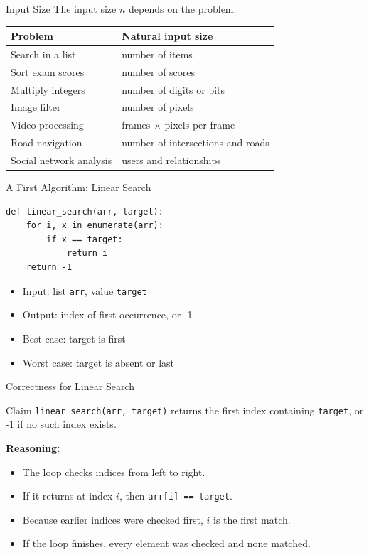 \documentclass[aspectratio=169,xcolor=dvipsnames]{beamer}
\begin{document}
\begin{frame}{Input Size}
  The input size $n$ depends on the problem.
  \begin{table}
    \centering
    \begin{tabular}{ll}
      \toprule
      Problem & Natural input size \\
      \midrule
      Search in a list & number of items \\
      Sort exam scores & number of scores \\
      Multiply integers & number of digits or bits \\
      Image filter & number of pixels \\
      Video processing & frames $\times$ pixels per frame \\
      Road navigation & number of intersections and roads \\
      Social network analysis & users and relationships \\
      \bottomrule
    \end{tabular}
  \end{table}
\end{frame}

\begin{frame}[fragile]{A First Algorithm: Linear Search}
  \begin{lstlisting}
def linear_search(arr, target):
    for i, x in enumerate(arr):
        if x == target:
            return i
    return -1
  \end{lstlisting}
  \vspace{0.4em}
  \begin{itemize}
    \item Input: list \texttt{arr}, value \texttt{target}
    \item Output: index of first occurrence, or -1
    \item Best case: target is first
    \item Worst case: target is absent or last
  \end{itemize}
\end{frame}

\begin{frame}{Correctness for Linear Search}
  \begin{block}{Claim}
    \texttt{linear\_search(arr, target)} returns the first index containing \texttt{target}, or -1 if no such index exists.
  \end{block}
  \textbf{Reasoning:}
  \begin{itemize}
    \item The loop checks indices from left to right.
    \item If it returns at index $i$, then \texttt{arr[i] == target}.
    \item Because earlier indices were checked first, $i$ is the first match.
    \item If the loop finishes, every element was checked and none matched.
  \end{itemize}
\end{frame}
\end{document}
